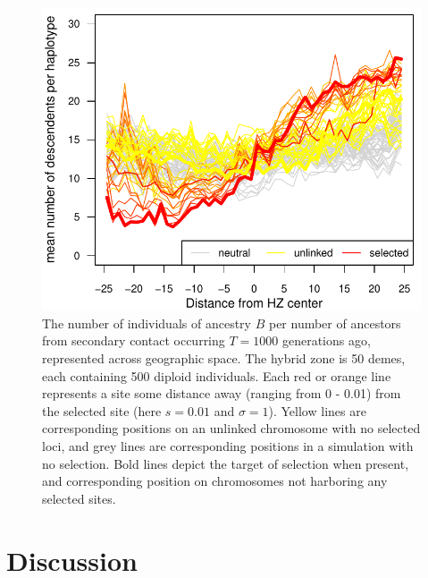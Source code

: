 \documentclass[11pt,letterpaper]{article}
\newcommand{\plr}[1]{{\em \color{blue} #1}}
\begin{document}
\begin{figure}
\includegraphics{figs/number_of_ancestors_tau1000}
\caption{The number of individuals of ancestry $B$ per number of ancestors from secondary contact occurring $T=1000$ generations ago, represented across geographic space. The hybrid zone is 50 demes, each containing 500 diploid individuals.
 Each red or orange line represents a site some distance away (ranging from 0 - 0.01) from the selected site (here $s=0.01$ and $\sigma=1$). Yellow lines are corresponding positions on an unlinked chromosome with no selected loci, and grey lines are corresponding positions in a simulation with no selection.  Bold lines depict the target of selection when present, and corresponding position on chromosomes not harboring any selected sites.}\label{Fig:family_size}
\end{figure}


\section*{Discussion}

\end{document}
